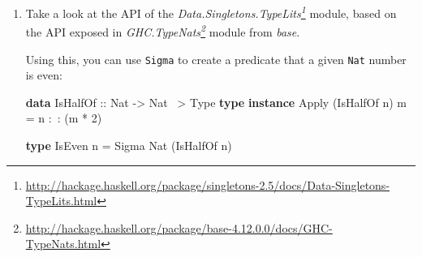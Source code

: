 \documentclass[]{article}
\newenvironment{Shaded}{}{}
\newcommand{\DataTypeTok}[1]{\textcolor[rgb]{0.56,0.13,0.00}{#1}}
\newcommand{\DecValTok}[1]{\textcolor[rgb]{0.25,0.63,0.44}{#1}}
\newcommand{\FunctionTok}[1]{\textcolor[rgb]{0.02,0.16,0.49}{#1}}
\newcommand{\KeywordTok}[1]{\textcolor[rgb]{0.00,0.44,0.13}{\textbf{#1}}}
\newcommand{\NormalTok}[1]{#1}
\newcommand{\OtherTok}[1]{\textcolor[rgb]{0.00,0.44,0.13}{#1}}
\renewcommand{\href}[2]{#2\footnote{\url{#1}}}
\begin{document}
\begin{enumerate}
  will contain a \texttt{Door} that must be knockable.

  Try doing it for both (a) the ``dependent proof'' version (with the
  \texttt{Knockable} data type) and for (b) the type family version (with the
  \texttt{StatePass} type family).

  \href{https://github.com/mstksg/inCode/tree/master/code-samples/singletons/Door3.hs\#L118-L118}{Solutions
  here!} I gave four different ways of doing it, for a full range of manual
  vs.~auto-promoted defunctionalization symbols and \texttt{Knockable} vs.
  \texttt{Pass}-based methods.

  \emph{Hint:} Look at the definition of \texttt{SomeDoor} in terms of
  \texttt{Sigma}:

\begin{Shaded}
\begin{Highlighting}[]
\KeywordTok{type} \DataTypeTok{SomeDoor} \FunctionTok{=} \DataTypeTok{Sigma} \DataTypeTok{DoorState}\NormalTok{ (}\DataTypeTok{TyCon1} \DataTypeTok{Door}\NormalTok{)}
\end{Highlighting}
\end{Shaded}

  \emph{Hint}: Try having \texttt{KnockableDoor} return a tuple.
\item
  Take a look at the API of the
  \emph{\href{http://hackage.haskell.org/package/singletons-2.5/docs/Data-Singletons-TypeLits.html}{Data.Singletons.TypeLits}}
  module, based on the API exposed in
  \emph{\href{http://hackage.haskell.org/package/base-4.12.0.0/docs/GHC-TypeNats.html}{GHC.TypeNats}}
  module from \emph{base}.

  Using this, you can use \texttt{Sigma} to create a predicate that a given
  \texttt{Nat} number is even:

\begin{Shaded}
\begin{Highlighting}[]
\KeywordTok{data} \DataTypeTok{IsHalfOf}\OtherTok{ ::} \DataTypeTok{Nat} \OtherTok{->} \DataTypeTok{Nat} \FunctionTok{~>} \DataTypeTok{Type}
\KeywordTok{type} \KeywordTok{instance} \DataTypeTok{Apply}\NormalTok{ (}\DataTypeTok{IsHalfOf}\NormalTok{ n) m }\FunctionTok{=}\NormalTok{ n }\FunctionTok{:~:}\NormalTok{ (m }\FunctionTok{*} \DecValTok{2}\NormalTok{)}

\KeywordTok{type} \DataTypeTok{IsEven}\NormalTok{ n }\FunctionTok{=} \DataTypeTok{Sigma} \DataTypeTok{Nat}\NormalTok{ (}\DataTypeTok{IsHalfOf}\NormalTok{ n)}
\end{Highlighting}
\end{Shaded}


\end{enumerate}
\end{document}
